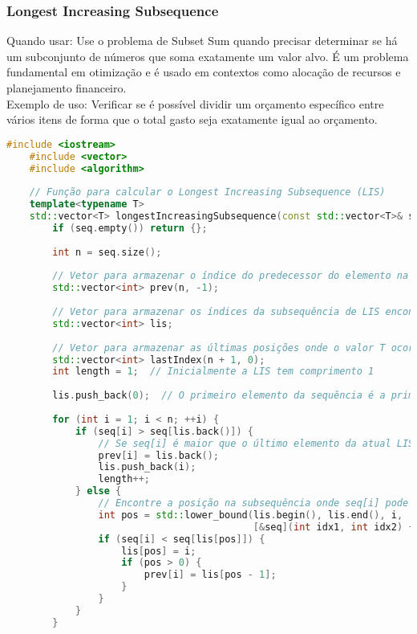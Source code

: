\documentclass{article}
\begin{document}
\subsubsection{Longest Increasing Subsequence}

Quando usar: Use o problema de Subset Sum quando precisar determinar se há um subconjunto de números que soma exatamente um valor alvo. É um problema fundamental em otimização e é usado em contextos como alocação de recursos e planejamento financeiro.
\\Exemplo de uso: Verificar se é possível dividir um orçamento específico entre vários itens de forma que o total gasto seja exatamente igual ao orçamento.

\begin{lstlisting}[language=C++, caption=Longest Increasing Subsequence]
    #include <iostream>
    #include <vector>
    #include <algorithm>
    
    // Função para calcular o Longest Increasing Subsequence (LIS)
    template<typename T>
    std::vector<T> longestIncreasingSubsequence(const std::vector<T>& seq) {
        if (seq.empty()) return {};
    
        int n = seq.size();
        
        // Vetor para armazenar o índice do predecessor do elemento na subsequência de LIS
        std::vector<int> prev(n, -1);
        
        // Vetor para armazenar os índices da subsequência de LIS encontrada
        std::vector<int> lis;
        
        // Vetor para armazenar as últimas posições onde o valor T ocorre nas subsequências de LIS de diferentes comprimentos
        std::vector<int> lastIndex(n + 1, 0);
        int length = 1;  // Inicialmente a LIS tem comprimento 1
        
        lis.push_back(0);  // O primeiro elemento da sequência é a primeira subsequência de comprimento 1
    
        for (int i = 1; i < n; ++i) {
            if (seq[i] > seq[lis.back()]) {
                // Se seq[i] é maior que o último elemento da atual LIS, podemos estender a LIS
                prev[i] = lis.back();
                lis.push_back(i);
                length++;
            } else {
                // Encontre a posição na subsequência onde seq[i] pode substituir um valor maior ou igual
                int pos = std::lower_bound(lis.begin(), lis.end(), i,
                                           [&seq](int idx1, int idx2) { return seq[idx1] < seq[idx2]; }) - lis.begin();
                if (seq[i] < seq[lis[pos]]) {
                    lis[pos] = i;
                    if (pos > 0) {
                        prev[i] = lis[pos - 1];
                    }
                }
            }
        }
    

\end{lstlisting}
\end{document}
